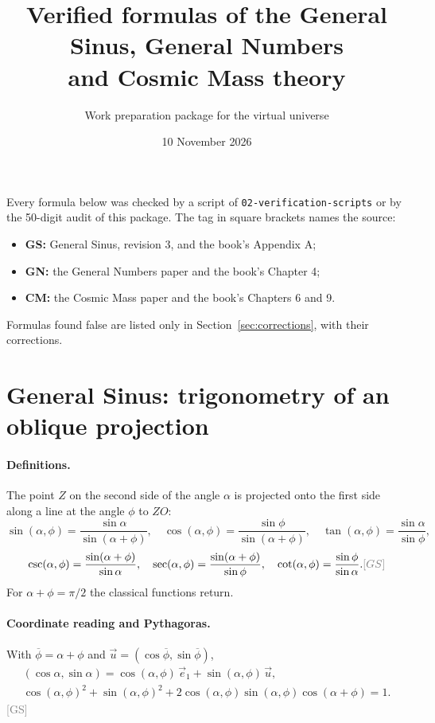 \documentclass[11pt]{article}
\title{Verified formulas of the General Sinus, General Numbers\\ and Cosmic Mass theory}
\author{Work preparation package for the virtual universe}
\date{10 November 2026}
\newcommand{\pb}{\overline{\phi}}
\newcommand{\src}[1]{\hfill{\small\textcolor{gray}{[#1]}}}
\begin{document}
\maketitle

\noindent Every formula below was checked by a script of \texttt{02-verification-scripts} or by
the 50-digit audit of this package. The tag in square brackets names the source:

\begin{itemize}
\item \textbf{GS:} General Sinus, revision 3, and the book's Appendix A;
\item \textbf{GN:} the General Numbers paper and the book's Chapter 4;
\item \textbf{CM:} the Cosmic Mass paper and the book's Chapters 6 and 9.
\end{itemize}

\noindent Formulas found false are listed only in Section~\ref{sec:corrections}, with
their corrections.

\section{General Sinus: trigonometry of an oblique projection}

\paragraph{Definitions.} The point $Z$ on the second side of the angle $\alpha$ is
projected onto the first side along a line at the angle $\phi$ to $ZO$:
\[
\sin(\alpha,\phi) = \frac{\sin\alpha}{\sin(\alpha+\phi)},\quad
\cos(\alpha,\phi) = \frac{\sin\phi}{\sin(\alpha+\phi)},\quad
\tan(\alpha,\phi) = \frac{\sin\alpha}{\sin\phi},
\]
\[
\csc(\alpha,\phi) = \frac{\sin(\alpha+\phi)}{\sin\alpha},\quad
\sec(\alpha,\phi) = \frac{\sin(\alpha+\phi)}{\sin\phi},\quad
\cot(\alpha,\phi) = \frac{\sin\phi}{\sin\alpha}.
\src{GS}
\]
For $\alpha+\phi = \pi/2$ the classical functions return.

\paragraph{Coordinate reading and Pythagoras.} With $\pb = \alpha+\phi$ and
$\vec u = (\cos\pb,\sin\pb)$,
\begin{gather*}
(\cos\alpha,\sin\alpha) = \cos(\alpha,\phi)\,\vec e_1 + \sin(\alpha,\phi)\,\vec u ,\\
\cos(\alpha,\phi)^2 + \sin(\alpha,\phi)^2 + 2\cos(\alpha,\phi)\sin(\alpha,\phi)\cos(\alpha+\phi) = 1 .
\end{gather*}\src{GS}
\end{document}
